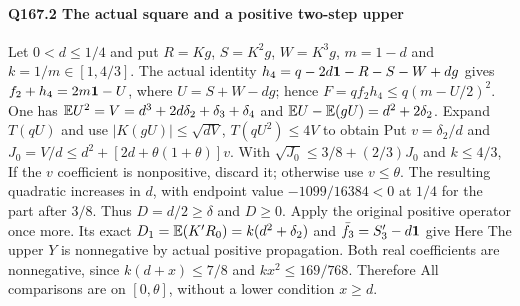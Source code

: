 \paragraph{Q167.2 The actual square and a positive two-step upper}\label{part:Q167.2}
Let $0<\allowbreak d\le\allowbreak 1/4$ and put $R=\allowbreak Kg$, $S=\allowbreak K^2g$, $W=\allowbreak K^3g$,
$m=\allowbreak 1-d$ and $k=\allowbreak 1/m\in[1,\allowbreak 4/3]$.
The actual identity $h_4=\allowbreak q-2d\mathbf1-R-S-W+dg$ gives
$f_2+h_4=\allowbreak 2m\mathbf1-U$, where $U=\allowbreak S+W-dg$; hence
$F=\allowbreak qf_2h_4\le\allowbreak  q(m-U/2)^2$.
One has $\mathbb E U^2=\allowbreak V=\allowbreak d^3+2d\delta_2+\delta_3+\delta_4$ and
$\mathbb E U-\mathbb E(gU)=\allowbreak d^2+2\delta_2$.
Expand $T(qU)$ and use $|K(gU)|\le\allowbreak \sqrt{dV}$,
$T(qU^2)\le\allowbreak 4V$ to obtain
Put $v=\allowbreak \delta_2/d$ and
$J_0=\allowbreak V/d\le\allowbreak  d^2+[2d+\theta(1+\theta)]v$.
With $\sqrt{J_0}\le\allowbreak 3/8+(2/3)J_0$ and $k\le\allowbreak 4/3$,
If the $v$ coefficient is nonpositive, discard it; otherwise use
$v\le\allowbreak \theta$. The resulting quadratic increases in $d$, with
endpoint value $-1099/16384<\allowbreak 0$ at $1/4$ for the part after $3/8$.
Thus $D=\allowbreak d/2\ge\allowbreak \delta$ and $D\ge\allowbreak 0$.
Apply the original positive operator once more. Its exact
$D_1=\allowbreak \mathbb E(K'R_0)=\allowbreak k(d^2+\delta_2)$ and $\bar f_3=\allowbreak S'_3-d\mathbf1$ give
Here
The upper $Y$ is nonnegative by actual positive propagation.
Both real coefficients are nonnegative, since
$k(d+x)\le\allowbreak 7/8$ and $kx^2\le\allowbreak 169/768$. Therefore
All comparisons are on $[0,\allowbreak \theta]$, without a lower condition $x\ge\allowbreak  d$.

